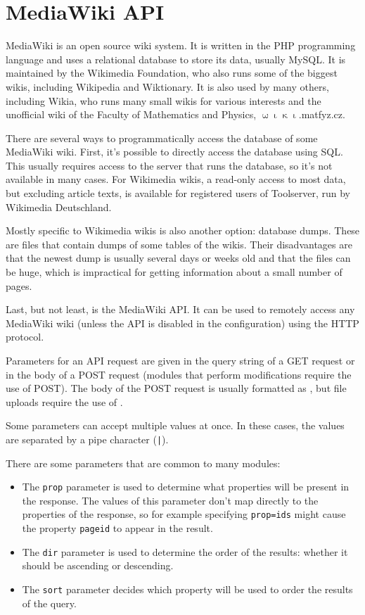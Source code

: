 \section{MediaWiki API}

MediaWiki is an open source wiki system.
It is written in the PHP programming language and uses a relational database to store its data, usually MySQL.
It is maintained by the Wikimedia Foundation, who also runs some of the biggest wikis, including Wikipedia and Wiktionary.
It is also used by many others, including Wikia, who runs many small wikis for various interests and
the unofficial wiki of the Faculty of Mathematics and Physics, $\upomega\upiota\upkappa\upiota$.matfyz.cz.

\medskip

There are several ways to programmatically access the database of some MediaWiki wiki.
First, it's possible to directly access the database using SQL.
This usually requires access to the server that runs the database, so it's not available in many cases.
For Wikimedia wikis, a read-only access to most data, but excluding article texts,
is available for registered users of Toolserver, run by Wikimedia Deutschland.

Mostly specific to Wikimedia wikis is also another option: database dumps. These are files that contain
dumps of some tables of the wikis. Their disadvantages are that the newest dump is usually several days or weeks old
and that the files can be huge, which is impractical for getting information about a small number of pages.

Last, but not least, is the MediaWiki API.
It can be used to remotely access any MediaWiki wiki (unless the API is disabled in the configuration)
using the HTTP protocol.

\medskip

Parameters for an API request are given in the query string of a GET request or in the body of a POST request
(modules that perform modifications require the use of POST).
The body of the POST request is usually formatted as ,
but file uploads require the use of .

Some parameters can accept multiple values at once.
In these cases, the values are separated by a pipe character (\texttt{|}).

There are some parameters that are common to many modules:

\begin{itemize}
\item The \texttt{prop} parameter is used to determine what properties will be present in the response.
The values of this parameter don't map directly to the properties of the response,
so for example specifying \texttt{prop=ids} might cause the property \texttt{pageid} to appear in the result.
\item The \texttt{dir} parameter is used to determine the order of the results:
whether it should be ascending or descending.
\item The \texttt{sort} parameter decides which property will be used to order the results of the query.
\end{itemize}

